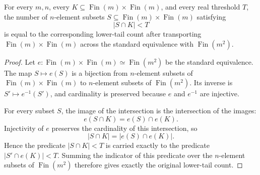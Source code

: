 \begin{helper}
For every \(m,n\), every \(K\subseteq \operatorname{Fin}(m)\times
\operatorname{Fin}(m)\), and every real threshold \(T\), the number of
\(n\)-element subsets \(S\subseteq \operatorname{Fin}(m)\times
\operatorname{Fin}(m)\) satisfying
\[
|S\cap K|<T
\]
is equal to the corresponding lower-tail count after transporting
\(\operatorname{Fin}(m)\times\operatorname{Fin}(m)\) across the standard
equivalence with \(\operatorname{Fin}(m^2)\).
\end{helper}
\begin{proof}
Let \(e:\operatorname{Fin}(m)\times\operatorname{Fin}(m)\simeq
\operatorname{Fin}(m^2)\) be the standard equivalence.  The map
\(S\mapsto e(S)\) is a bijection from \(n\)-element subsets of
\(\operatorname{Fin}(m)\times\operatorname{Fin}(m)\) to \(n\)-element subsets
of \(\operatorname{Fin}(m^2)\).  Its inverse is \(S'\mapsto e^{-1}(S')\), and
cardinality is preserved because \(e\) and \(e^{-1}\) are injective.

For every subset \(S\), the image of the intersection is the intersection of
the images:
\[
e(S\cap K)=e(S)\cap e(K).
\]
Injectivity of \(e\) preserves the cardinality of this intersection, so
\[
|S\cap K|=|e(S)\cap e(K)|.
\]
Hence the predicate \(|S\cap K|<T\) is carried exactly to the predicate
\(|S'\cap e(K)|<T\).  Summing the indicator of this predicate over the
\(n\)-element subsets of \(\operatorname{Fin}(m^2)\) therefore gives exactly
the original lower-tail count.
\end{proof}
